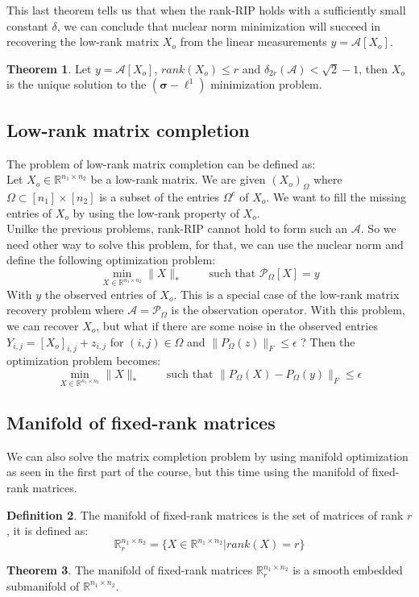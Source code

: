 \documentclass[12pt, openany]{report}
\newcommand{\R}{\mathbb{R}}
\theoremstyle{definition}
\newtheorem{thm}{Theorem}[chapter]
\newtheorem{definition}[thm]{Definition}
\begin{document}
This last theorem tells us that when the rank-RIP holds with a sufficiently small constant $\delta$, we can conclude that nuclear norm minimization will succeed in recovering the low-rank matrix $X_o$ from the linear measurements $y = \mathcal{A}[X_o]$.
\begin{thm}
	Let $y = \mathcal{A}[X_o]$, $rank(X_o) \leq r$ and $\delta_{2r}(\mathcal{A}) < \sqrt{2}-1$, then $X_o$ is the unique solution to the $(\boldsymbol{\sigma}-\ell^1)$ minimization problem. 
\end{thm}
\subsection{Low-rank matrix completion}
The problem of low-rank matrix completion can be defined as:\\
Let $X_o \in \R^{n_1 \times n_2}$ be a low-rank matrix. We are given $(X_o)_{\Omega}$ where $\Omega \subset [n_1]\times [n_2]$ is a subset of the entries $\Omega^c$ of $X_o$. We want to fill the missing entries of $X_o$ by using the low-rank property of $X_o$.\\
Unilke the previous problems, rank-RIP cannot hold to form such an $\mathcal{A}$. So we need other way to solve this problem, for that, we can use the nuclear norm and define the following optimization problem:
\begin{equation}
	\min_{X\in \R^{n_1 \times n_2}} \|X\|_* \qquad \text{ such that } \mathcal{P}_\Omega[X] = y
\end{equation}
With $y$ the observed entries of $X_o$. This is a special case of the low-rank matrix recovery problem where $\mathcal{A} = \mathcal{P}_\Omega$ is the observation operator. With this problem, we can recover $X_o$, but what if there are some noise in the observed entries $Y_{i,j} = [X_o]_{i,j} + z_{i,j}$ for $(i,j) \in \Omega$ and $\|P_\Omega(z)\|_F \leq \epsilon$ ? Then the optimization problem becomes:
\begin{equation}
	\min_{X\in \R^{n_1 \times n_2}} \|X\|_* \qquad \text{ such that } \|P_\Omega(X)-P_\Omega(y)\|_F \leq \epsilon
\end{equation} 
\subsection{Manifold of fixed-rank matrices}
We can also solve the matrix completion problem by using manifold optimization as seen in the first part of the course, but this time using the manifold of fixed-rank matrices.
\begin{definition}
	The manifold of fixed-rank matrices is the set of matrices of rank $r$, it is defined as:
	\begin{equation}
		\R_r^{n_1 \times n_2} = \{X\in \R^{n_1\times n_2} | rank(X) = r\}
	\end{equation}
\end{definition}
\begin{thm}
	The manifold of fixed-rank matrices $\R_r^{n_1 \times n_2}$ is a smooth embedded submanifold of $\R^{n_1 \times n_2}$.
\end{thm}
\end{document}
